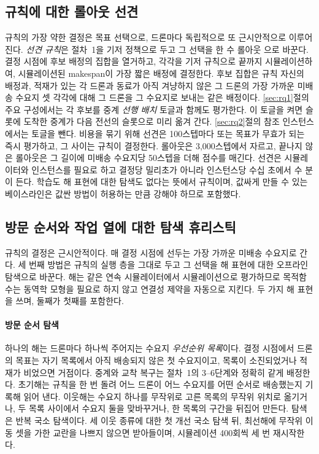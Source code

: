 \documentclass[final,5p,times,twocolumn]{elsarticle}
\begin{document}
\subsection{규칙에 대한 롤아웃 선견}
\label{sec:lookahead}

규칙의 가장 약한 결정은 목표 선택으로, 드론마다 독립적으로 또 근시안적으로 이루어진다. \emph{선견
규칙}은 절차~1을 기저 정책으로 두고 그 선택을 한 수 롤아웃 \cite{bertsekas1997rollout}으로 바꾼다.
결정 시점에 후보 배정의 집합을 열거하고, 각각을 기저 규칙으로 끝까지 시뮬레이션하여, 시뮬레이션된
makespan이 가장 짧은 배정에 결정한다. 후보 집합은 규칙 자신의 배정과, 적재가 있는 각 드론과 동료가
아직 겨냥하지 않은 그 드론의 가장 가까운 미배송 수요지 셋 각각에 대해 그 드론을 그 수요지로 보내는
같은 배정이다. \ref{sec:rq1}절의 주요 구성에서는 각 후보를 중계 \emph{선행 배치} 토글과 함께도
평가한다. 이 토글을 켜면 슬롯에 도착한 중계가 다음 전선의 슬롯으로 미리 옮겨 간다. \ref{sec:rq2}절의
참조 인스턴스에서는 토글을 뺀다. 비용을 묶기 위해 선견은 100스텝마다 또는 목표가 무효가 되는 즉시
평가하고, 그 사이는 규칙이 결정한다. 롤아웃은 3{,}000스텝에서 자르고, 끝나지 않은 롤아웃은 그 길이에
미배송 수요지당 50스텝을 더해 점수를 매긴다. 선견은 시뮬레이터와 인스턴스를 필요로 하고 결정당
밀리초가 아니라 인스턴스당 수십 초에서 수 분이 든다. 학습도 해 표현에 대한 탐색도 없다는 뜻에서
규칙이며, 값싸게 만들 수 있는 베이스라인은 값싼 방법이 허용하는 만큼 강해야 하므로 포함했다.

\subsection{방문 순서와 작업 열에 대한 탐색 휴리스틱}
\label{sec:search}

규칙의 결정은 근시안적이다. 매 결정 시점에 선두는 가장 가까운 미배송 수요지로 간다. 세 번째
방법은 규칙의 실행 층을 그대로 두고 그 선택을 해 표현에 대한 오프라인 탐색으로 바꾼다. 해는 같은
연속 시뮬레이터에서 시뮬레이션으로 평가하므로 목적함수는 동역학 모형을 필요로 하지 않고 연결성
제약을 자동으로 지킨다. 두 가지 해 표현을 쓰며, 둘째가 첫째를 포함한다.

\paragraph{방문 순서 탐색}
하나의 해는 드론마다 하나씩 주어지는 수요지 \emph{우선순위 목록}이다. 결정 시점에서 드론의
목표는 자기 목록에서 아직 배송되지 않은 첫 수요지이고, 목록이 소진되었거나 적재가 비었으면
거점이다. 중계와 교착 복구는 절차~1의 3--6단계와 정확히 같게 배정한다. 초기해는 규칙을 한 번
돌려 어느 드론이 어느 수요지를 어떤 순서로 배송했는지 기록해 읽어 낸다. 이웃해는 수요지 하나를
무작위로 고른 목록의 무작위 위치로 옮기거나, 두 목록 사이에서 수요지 둘을 맞바꾸거나, 한 목록의
구간을 뒤집어 만든다. 탐색은 반복 국소 탐색이다. 세 이웃 종류에 대한 첫 개선 국소 탐색 뒤, 최선해에
무작위 이동 셋을 가한 교란을 나쁘지 않으면 받아들이며, 시뮬레이션 400회씩 세 번 재시작한다.
\end{document}
